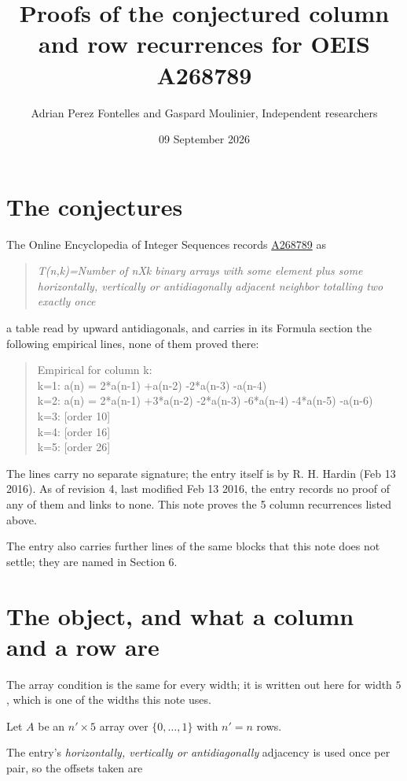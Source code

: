 \documentclass[11pt]{article}
\title{Proofs of the conjectured column and row recurrences for OEIS A268789}
\author{Adrian Perez Fontelles and Gaspard Moulinier, Independent researchers}
\date{09 September 2026}
\theoremstyle{definition}
\begin{document}
\maketitle
\section{The conjectures}

The Online Encyclopedia of Integer Sequences records \href{https://oeis.org/A268789}{A268789} as

\begin{quote}\itshape T(n,k)=Number of nXk binary arrays with some element plus some horizontally, vertically or antidiagonally adjacent neighbor totalling two exactly once\end{quote}

a table read by upward antidiagonals, and carries in its Formula section the following empirical lines, none of them proved there:

\begin{quote}\ttfamily Empirical for column k:\\
k=1: a(n) = 2*a(n-1) +a(n-2) -2*a(n-3) -a(n-4)\\k=2: a(n) = 2*a(n-1) +3*a(n-2) -2*a(n-3) -6*a(n-4) -4*a(n-5) -a(n-6)\\k=3: [order 10]\\k=4: [order 16]\\k=5: [order 26]\end{quote}

The lines carry no separate signature; the entry itself is by R. H. Hardin (Feb 13 2016). As of revision 4, last modified Feb 13 2016, the entry records no proof of any of them and links to none. This note proves the 5 column recurrences listed above.

The entry also carries further lines of the same blocks that this note does not settle; they are named in Section 6.

\section{The object, and what a column and a row are}

The array condition is the same for every width; it is written out here for width $5$, which is one of the widths this note uses.

Let $A$ be an $n' \times 5$ array over $\{0,\dots,1\}$ with $n' = n$ rows.

The entry's {\itshape horizontally, vertically or antidiagonally} adjacency is used once per pair, so the offsets taken are
\end{document}
